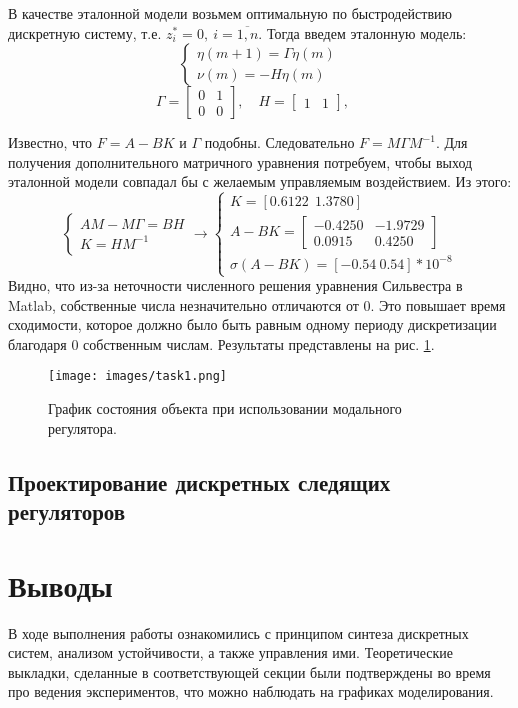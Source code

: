 \documentclass[a4paper, 14pt]{extarticle}
\theoremstyle{definition}
\theoremstyle{plain}
\theoremstyle{remark}
\begin{document}
В качестве эталонной модели возьмем оптимальную по быстродействию дискретную систему, т.е. \(z_i^* = 0,~i=\overline{1,n}\).
Тогда введем эталонную модель:
\[
	\begin{cases}
		\eta(m+1) = \Gamma \eta(m) \\
		\nu(m) = -H \eta(m)
	\end{cases}
\]
\[
	\Gamma = \begin{bmatrix} 0 & 1 \\ 0 & 0 \end{bmatrix}, \quad
	H = \begin{bmatrix} 1 & 1 \end{bmatrix}, \quad
\]

Известно, что \(F = A - BK\) и \(\Gamma\) подобны. Следовательно \(F = M \Gamma M^{-1}\). Для получения дополнительного матричного уравнения потребуем, чтобы выход эталонной модели совпадал бы с желаемым управляемым воздействием.
Из этого:
\[
	\begin{cases}
		AM - M \Gamma = BH \\
		K = HM^{-1}
	\end{cases} \rightarrow
	\begin{cases}
		K = [0.6122~~1.3780]\\
		A - BK = \begin{bmatrix}
			-0.4250 & -1.9729 \\
			0.0915 & 0.4250
			\end{bmatrix} \\
		\sigma(A - BK) = [-0.54 ~ 0.54]*10^{-8}
	\end{cases} 
\]
Видно, что из-за неточности численного решения уравнения Сильвестра в Matlab, собственные числа незначительно отличаются от 0. Это повышает время сходимости, которое должно было быть равным одному периоду дискретизации благодаря 0 собственным числам. Результаты представлены на рис. \ref{fig:task1}.
\begin{figure}
	[H]
	\centering
	\texttt{[image: images/task1.png]}
	\caption{График состояния объекта при использовании модального регулятора.}
	\label{fig:task1}
\end{figure}

\subsection{Проектирование дискретных следящих регуляторов}

\newpage
\section{Выводы}
В ходе выполнения работы ознакомились с принципом синтеза дискретных систем, анализом устойчивости, а также управления ими. Теоретические выкладки, сделанные в соответствующей секции были подтверждены во время про ведения экспериментов, что можно наблюдать на графиках моделирования.
\end{document}
